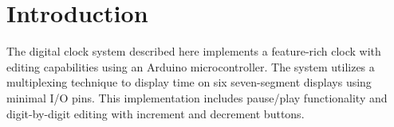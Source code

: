 \section{Introduction}
The digital clock system described here implements a feature-rich clock with editing capabilities using an Arduino microcontroller. The system utilizes a multiplexing technique to display time on six seven-segment displays using minimal I/O pins. This implementation includes pause/play functionality and digit-by-digit editing with increment and decrement buttons.
